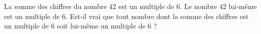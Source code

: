 
\begin{exercice}\label{exosmath-0787}

    La somme des chiffres du nombre \( 42\) est un multiple de \( 6\). Le nombre \( 42\) lui-même est un multiple de \( 6\). Est-il vrai que tout nombre dont la somme des chiffres est un multiple de \( 6\) soit lui-même un multiple de \( 6\) ?

\end{exercice}
